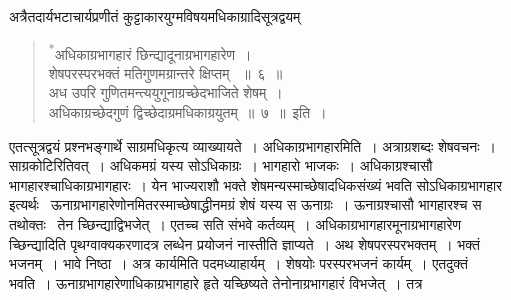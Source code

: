 \documentclass[11pt, openany]{book}
\begin{document}
\indent
अत्रैतदार्यभटाचार्यप्रणीतं कुट्टाकारयुग्मविषयमधिकाग्रादिसूत्रद्वयम् \textendash
\begin{quote}
\ks
{\textsuperscript{*}}अधिकाग्रभागहारं छिन्द्यादूनाग्रभागहारेण~।\\
शेषपरस्परभक्तं मतिगुणमग्रान्तरे क्षिप्तम् ~॥~६~॥\\
अध उपरि गुणितमन्त्ययुगूनाग्रच्छेदभाजिते शेषम्~।\\
अधिकाग्रच्छेदगुणं द्विच्छेदाग्रमधिकाग्रयुतम्~॥~७~॥~इति~।
\end{quote}
\indent
एतत्सूत्रद्वयं प्रश्नभङ्गार्थे साग्रमधिकृत्य व्याख्यायते~। अधिकाग्रभागहारमिति~। अत्राग्रशब्दः शेषवचनः~। साग्रकोटिरितिवत्~। अधिकमग्रं यस्य सोऽधिकाग्रः~। भागहारो भाजकः~। अधिकाग्रश्चासौ भागहारश्चाधिकाग्रभागहारः~। येन भाज्यराशौ भक्ते शेषमन्यस्माच्छेषादधिकसंख्यं भवति सोऽधिकाग्रभागहार इत्यर्थः \textendash \ ऊनाग्रभागहारेणोनमितरस्माच्छेषाद्धीनमग्रं शेषं यस्य स ऊनाग्रः~। ऊनाग्रश्चासौ भागहारश्च स तथोक्तः \textendash\ तेन च्छिन्द्याद्विभजेत्~। एतच्च सति संभवे कर्तव्यम्~। अधिकाग्रभागहारमूनाग्रभागहारेण च्छिन्द्यादिति पृथग्वाक्यकरणादत्र लब्धेन प्रयोजनं नास्तीति ज्ञाप्यते~। अथ शेषपरस्परभक्तम्~। भक्तं भजनम्~। भावे निष्ठा~। अत्र
कार्यमिति पदमध्याहार्यम्~। शेषयोः परस्परभजनं कार्यम्~। एतदुक्तं भवति~। ऊनाग्रभागहारेणाधिकाग्रभागहारे हृते यच्छिष्यते तेनोनाग्रभागहारं विभजेत्~। तत्र

\end{document}
